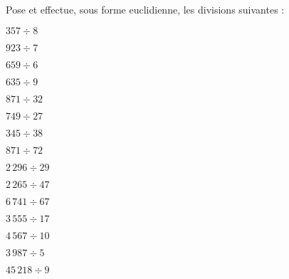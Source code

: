 Pose et effectue, sous forme euclidienne, les divisions suivantes :
\begin{multicols}{5}
\begin{myenumerate}
\item $357\div8$
\item $923\div7$
\item $659\div6$
\item $635\div9$
\item $871\div32$
\item $749\div27$
\item $345\div38$
\item $871\div72$
\item $2\,296\div29$
\item $2\,265\div47$
\item $6\,741\div67$
\item $3\,555\div17$
\item $4\,567\div10$
\item $3\,987\div5$
\item $45\,218\div9$
\end{myenumerate}
\end{multicols}
\begin{multicols}{3}
\begin{myenumerate}
\item\subitem{}\par {}
\item\subitem{}\par {}
\item\subitem{}\par {}
\item\subitem{}\par {}
\item\subitem{}\par {}
\item\subitem{}\par {}
\item\subitem{}\par {}
\item\subitem{}\par {}
\item\subitem{}\par {}
\item\subitem{}\par {}
\item\subitem{}\par {}
\item\subitem{}\par {}
\item\subitem{}\par {}
\item\subitem{}\par {}
\item\subitem{}\par {}
\end{myenumerate}
\end{multicols}
